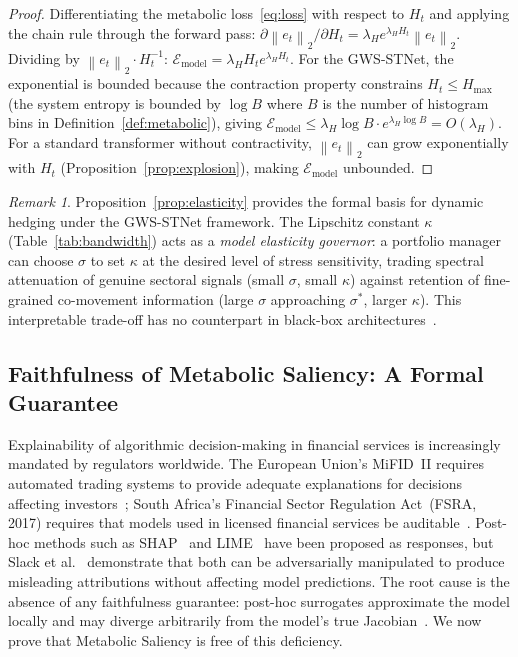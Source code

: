 \documentclass[11pt,a4paper]{article}  %
\newcommand{\norm}[1]{\left\lVert#1\right\rVert}
\theoremstyle{plain}
\theoremstyle{definition}
\theoremstyle{remark}
\newtheorem{remark}{Remark}[section]
\begin{document}
\begin{proof}
Differentiating the metabolic loss~\eqref{eq:loss} with respect to
$H_t$ and applying the chain rule through the forward pass:
$\partial \norm{e_t}_2 / \partial H_t = \lambda_H e^{\lambda_H H_t}
\norm{e_t}_2$. Dividing by $\norm{e_t}_2 \cdot H_t^{-1}$:
$\mathcal{E}_{\mathrm{model}} = \lambda_H H_t e^{\lambda_H H_t}$.
For the GWS-STNet, the exponential is bounded because the contraction
property constrains $H_t \leq H_{\max}$ (the system entropy is bounded
by $\log B$ where $B$ is the number of histogram bins in
Definition~\ref{def:metabolic}), giving $\mathcal{E}_{\mathrm{model}}
\leq \lambda_H \log B \cdot e^{\lambda_H \log B} = O(\lambda_H)$.
For a standard transformer without contractivity, $\norm{e_t}_2$ can
grow exponentially with $H_t$ (Proposition~\ref{prop:explosion}),
making $\mathcal{E}_{\mathrm{model}}$ unbounded.
\end{proof}

\begin{remark}
Proposition~\ref{prop:elasticity} provides the formal basis for
dynamic hedging under the GWS-STNet framework. The Lipschitz
constant $\kappa$ (Table~\ref{tab:bandwidth}) acts as a
\emph{model elasticity governor}: a portfolio manager can choose
$\sigma$ to set $\kappa$ at the desired level of stress sensitivity,
trading spectral attenuation of genuine sectoral signals
(small $\sigma$, small $\kappa$) against retention of fine-grained
co-movement information (large $\sigma$ approaching $\sigma^*$,
larger $\kappa$). This interpretable trade-off has no counterpart in
black-box architectures~\cite{Bianchi2021}.
\end{remark}

\subsection{Faithfulness of Metabolic Saliency: A Formal Guarantee}
\label{subsec:regulatory}

Explainability of algorithmic decision-making in financial services
is increasingly mandated by regulators worldwide. The European
Union's MiFID~II requires automated trading systems to provide
adequate explanations for decisions affecting investors~\cite{MiFID2014};
South Africa's Financial Sector Regulation Act~(FSRA, 2017) requires
that models used in licensed financial services be
auditable~\cite{FSRA2017}. Post-hoc methods such as SHAP~\cite{Lundberg2017}
and LIME~\cite{Ribeiro2016} have been proposed as responses, but
Slack et al.~\cite{Slack2020} demonstrate that both can be
adversarially manipulated to produce misleading attributions without
affecting model predictions. The root cause is the absence of any
faithfulness guarantee: post-hoc surrogates approximate the model
locally and may diverge arbitrarily from the model's true
Jacobian~\cite{Adebayo2018}. We now prove that Metabolic Saliency
is free of this deficiency.
\end{document}

